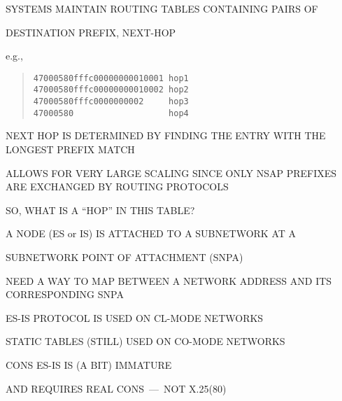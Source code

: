 \begin{bwslide}

\begin{nrtc}
\item	SYSTEMS MAINTAIN ROUTING TABLES CONTAINING PAIRS OF
    \begin{nrtc}
    \item	DESTINATION PREFIX, NEXT-HOP
    \end{nrtc}
    e.g.,
\begin{quote}\small\begin{verbatim}
47000580fffc00000000010001 hop1
47000580fffc00000000010002 hop2
47000580fffc0000000002     hop3
47000580                   hop4
\end{verbatim}\end{quote}

\item	NEXT HOP IS DETERMINED BY FINDING THE ENTRY WITH THE LONGEST PREFIX
	MATCH 

\item	ALLOWS FOR VERY LARGE SCALING SINCE ONLY NSAP PREFIXES ARE EXCHANGED
	BY ROUTING PROTOCOLS

\item	SO, WHAT IS A ``HOP'' IN THIS TABLE?
\end{nrtc}
\end{bwslide}


\begin{bwslide}

\begin{nrtc}
\item	A NODE (ES or IS) IS ATTACHED TO A SUBNETWORK AT A
    \begin{nrtc}
    \item	SUBNETWORK POINT OF ATTACHMENT (SNPA)
    \end{nrtc}

\item	NEED A WAY TO MAP BETWEEN A NETWORK ADDRESS
	AND ITS CORRESPONDING SNPA

\item	ES-IS PROTOCOL IS USED ON CL-MODE NETWORKS

\item	STATIC TABLES (STILL) USED ON CO-MODE NETWORKS
    \begin{nrtc}
    \item	CONS ES-IS IS (A BIT) IMMATURE

    \item	AND REQUIRES REAL CONS~---~NOT X.25(80)
    \end{nrtc}
\end{nrtc}
\end{bwslide}


